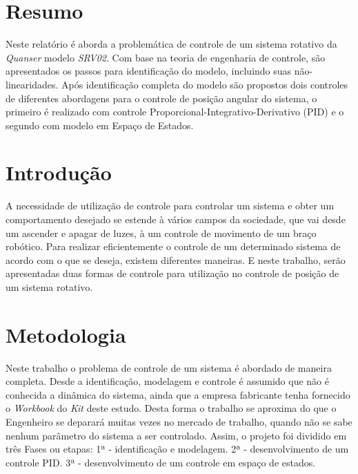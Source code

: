 \documentclass[a4paper,11pt]{article}
\author{Rafael Lima}
\begin{document}

\section{Resumo}

Neste relatório é aborda a problemática de controle de um sistema rotativo da \textit{Quanser} modelo \textit{SRV02}. Com base na teoria de engenharia de controle, são apresentados os passos para identificação do modelo, incluindo suas não-linearidades. Após identificação completa do modelo são propostos dois controles de diferentes abordagens para o controle de posição angular do sistema, o primeiro é realizado com controle Proporcional-Integrativo-Derivativo (PID) e o segundo com modelo em Espaço de Estados.

\section{Introdução}

A necessidade de utilização de controle para controlar um sistema e obter um comportamento desejado se estende à vários campos da sociedade, que vai desde um ascender e apagar de luzes, à um controle de movimento de um braço robótico.
Para realizar eficientemente o controle de um determinado sistema de acordo com o que se deseja, existem diferentes maneiras.
E neste trabalho, serão apresentadas duas formas de controle para utilização no controle de posição de um sistema rotativo.


\section{Metodologia}

Neste trabalho o problema de controle de um sistema é abordado de maneira completa. Desde a identificação, modelagem e controle é assumido que não é conhecida a dinâmica do sistema, ainda que a empresa fabricante tenha fornecido o \textit{Workbook} \cite{studentWorkbook} do \textit{Kit} deste estudo. Desta forma o trabalho se aproxima do que o Engenheiro se deparará muitas vezes no mercado de trabalho, quando não se sabe nenhum parâmetro do sistema a ser controlado. Assim, o projeto foi dividido em três Fases ou etapas: 1ª - identificação e modelagem. 2ª - desenvolvimento de um controle PID. 3ª - desenvolvimento de um controle em espaço de estados.
\end{document}
